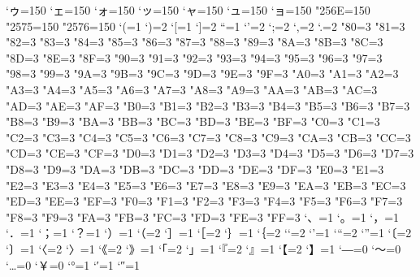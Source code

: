 \prebreakpenalty`ゥ=150
\prebreakpenalty`ェ=150
\prebreakpenalty`ォ=150
\prebreakpenalty`ッ=150
\prebreakpenalty`ャ=150
\prebreakpenalty`ュ=150
\prebreakpenalty`ョ=150
\prebreakpenalty\jis"256E=150
\prebreakpenalty\jis"2575=150
\prebreakpenalty\jis"2576=150
\xspcode`(=1
\xspcode`)=2
\xspcode`[=1
\xspcode`]=2
\xspcode``=1
\xspcode`'=2
\xspcode`;=2
\xspcode`,=2
\xspcode`.=2
\xspcode"80=3
\xspcode"81=3
\xspcode"82=3
\xspcode"83=3
\xspcode"84=3
\xspcode"85=3
\xspcode"86=3
\xspcode"87=3
\xspcode"88=3
\xspcode"89=3
\xspcode"8A=3
\xspcode"8B=3
\xspcode"8C=3
\xspcode"8D=3
\xspcode"8E=3
\xspcode"8F=3
\xspcode"90=3
\xspcode"91=3
\xspcode"92=3
\xspcode"93=3
\xspcode"94=3
\xspcode"95=3
\xspcode"96=3
\xspcode"97=3
\xspcode"98=3
\xspcode"99=3
\xspcode"9A=3
\xspcode"9B=3
\xspcode"9C=3
\xspcode"9D=3
\xspcode"9E=3
\xspcode"9F=3
\xspcode"A0=3
\xspcode"A1=3
\xspcode"A2=3
\xspcode"A3=3
\xspcode"A4=3
\xspcode"A5=3
\xspcode"A6=3
\xspcode"A7=3
\xspcode"A8=3
\xspcode"A9=3
\xspcode"AA=3
\xspcode"AB=3
\xspcode"AC=3
\xspcode"AD=3
\xspcode"AE=3
\xspcode"AF=3
\xspcode"B0=3
\xspcode"B1=3
\xspcode"B2=3
\xspcode"B3=3
\xspcode"B4=3
\xspcode"B5=3
\xspcode"B6=3
\xspcode"B7=3
\xspcode"B8=3
\xspcode"B9=3
\xspcode"BA=3
\xspcode"BB=3
\xspcode"BC=3
\xspcode"BD=3
\xspcode"BE=3
\xspcode"BF=3
\xspcode"C0=3
\xspcode"C1=3
\xspcode"C2=3
\xspcode"C3=3
\xspcode"C4=3
\xspcode"C5=3
\xspcode"C6=3
\xspcode"C7=3
\xspcode"C8=3
\xspcode"C9=3
\xspcode"CA=3
\xspcode"CB=3
\xspcode"CC=3
\xspcode"CD=3
\xspcode"CE=3
\xspcode"CF=3
\xspcode"D0=3
\xspcode"D1=3
\xspcode"D2=3
\xspcode"D3=3
\xspcode"D4=3
\xspcode"D5=3
\xspcode"D6=3
\xspcode"D7=3
\xspcode"D8=3
\xspcode"D9=3
\xspcode"DA=3
\xspcode"DB=3
\xspcode"DC=3
\xspcode"DD=3
\xspcode"DE=3
\xspcode"DF=3
\xspcode"E0=3
\xspcode"E1=3
\xspcode"E2=3
\xspcode"E3=3
\xspcode"E4=3
\xspcode"E5=3
\xspcode"E6=3
\xspcode"E7=3
\xspcode"E8=3
\xspcode"E9=3
\xspcode"EA=3
\xspcode"EB=3
\xspcode"EC=3
\xspcode"ED=3
\xspcode"EE=3
\xspcode"EF=3
\xspcode"F0=3
\xspcode"F1=3
\xspcode"F2=3
\xspcode"F3=3
\xspcode"F4=3
\xspcode"F5=3
\xspcode"F6=3
\xspcode"F7=3
\xspcode"F8=3
\xspcode"F9=3
\xspcode"FA=3
\xspcode"FB=3
\xspcode"FC=3
\xspcode"FD=3
\xspcode"FE=3
\xspcode"FF=3
\inhibitxspcode`、=1
\inhibitxspcode`。=1
\inhibitxspcode`，=1
\inhibitxspcode`．=1
\inhibitxspcode`；=1
\inhibitxspcode`？=1
\inhibitxspcode`）=1
\inhibitxspcode`（=2
\inhibitxspcode`］=1
\inhibitxspcode`［=2
\inhibitxspcode`｝=1
\inhibitxspcode`｛=2
\inhibitxspcode`‘=2
\inhibitxspcode`’=1
\inhibitxspcode`“=2
\inhibitxspcode`”=1
\inhibitxspcode`〔=2
\inhibitxspcode`〕=1
\inhibitxspcode`〈=2
\inhibitxspcode`〉=1
\inhibitxspcode`《=2
\inhibitxspcode`》=1
\inhibitxspcode`「=2
\inhibitxspcode`」=1
\inhibitxspcode`『=2
\inhibitxspcode`』=1
\inhibitxspcode`【=2
\inhibitxspcode`】=1
\inhibitxspcode`―=0
\inhibitxspcode`〜=0
\inhibitxspcode`…=0
\inhibitxspcode`￥=0
\inhibitxspcode`°=1
\inhibitxspcode`′=1
\inhibitxspcode`″=1
\endinput
